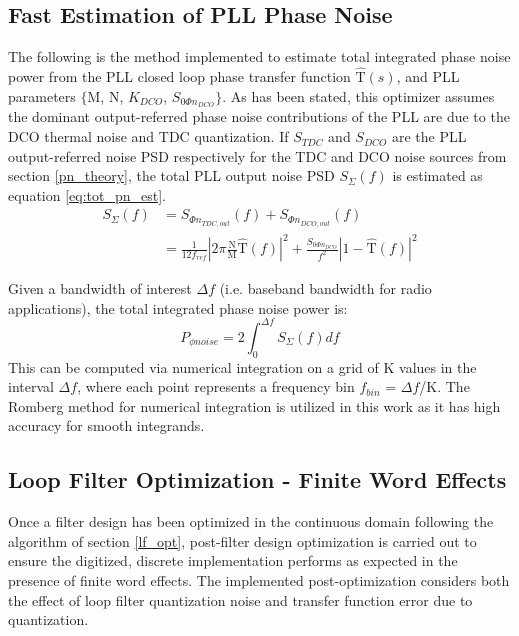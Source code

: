 \subsection{Fast Estimation of PLL Phase Noise}\label{est_pn}
	The following is the method implemented to estimate total integrated phase noise power from the PLL closed loop phase transfer function $\mathrm{\hat{T}}(s)$, and PLL parameters $\{\mathrm{M}$, $\mathrm{N}$, $K_{DCO}$, $S_{0\Phi n_{DCO}}\}$. As has been stated, this optimizer assumes the dominant output-referred phase noise contributions of the PLL are due to the DCO thermal noise and TDC quantization. If $S_{TDC}$ and $S_{DCO}$ are the PLL output-referred noise PSD respectively for the TDC and DCO noise sources from section \ref{pn_theory}, the total PLL output noise PSD $S_{\Sigma}(f)$ is estimated as equation \ref{eq:tot_pn_est}.
	\begin{align}\label{eq:tot_pn_est}
		S_{\Sigma}(f) &= S_{\Phi n_{TDC,out}}(f) + S_{\Phi n_{DCO,out}}(f)\\
		 &= \frac{1}{12f_{ref}}\left|2\pi\frac{\mathrm{N}}{\mathrm{M}}\hat{\mathrm{T}}(f)\right|^2 + \frac{S_{0\Phi n_{DCO}}}{f^2}\left|1-\hat{\mathrm{T}}(f)\right|^2
	\end{align}

	Given a bandwidth of interest $\Delta f$ (i.e. baseband bandwidth for radio applications), the total integrated phase noise power is:
	\begin{equation}
		P_{\phi noise} = 2\int_0^{\Delta f} S_{\Sigma}(f)df
	\end{equation}
	This can be computed via numerical integration on a grid of K values in the interval $\Delta f$, where each point represents a frequency bin $f_{bin}$ = $\Delta f$/K. The Romberg method for numerical integration \cite{numerical_methods_2011} is utilized in this work as it has high accuracy for smooth integrands.


\subsection{Loop Filter Optimization - Finite Word Effects}
Once a filter design has been optimized in the continuous domain following the algorithm of section \ref{lf_opt}, post-filter design optimization is carried out to ensure the digitized, discrete implementation performs as expected in the presence of finite word effects. The implemented post-optimization considers both the effect of loop filter quantization noise and transfer function error due to quantization.

